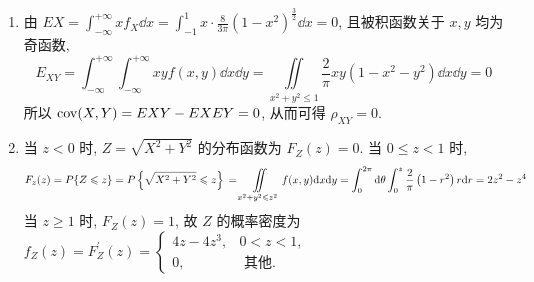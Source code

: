 \begin{solution}
\begin{enumerate}[label=(\arabic{*})]
        \item 由 $\displaystyle EX=\int_{-\infty}^{+\infty} x f_{X} \dd x=\int_{-1}^{1} x \cdot \frac{8}{3 \pi}\left(1-x^{2}\right)^{\frac{3}{2}} \dd x=0$, 且被积函数关于 $ x, y $ 均为奇函数, $$\displaystyle E_{X Y}  =\int_{-\infty}^{+\infty} \int_{-\infty}^{+\infty} x y f(x, y) \dd x \dd y
                  =\iint\limits_{x^{2}+y^{2} \leqslant 1}\frac{2}{\pi} x y\left(1-x^{2}-y^{2}\right) \dd x \dd y=0$$
              所以 $ \mathrm{cov}(X, Y)=E X Y-E X E Y=0 $, 从而可得 $ \rho_{X Y}=0 $.
        \item 当 $ z<0 $ 时, $ Z=\sqrt{X^{2}+Y^{2}} $ 的分布函数为 $ F_{Z}(z)=0 $.
              当 $ 0 \leqslant z<1 $ 时,
              $$
                  F_{z}(z) =P\{Z \leqslant z\}=P\left\{\sqrt{X^{2}+Y^{2}} \leqslant z\right\} \\
                  =\iint\limits_{x^{2}+y^{2} \leqslant z^{2}} f(x, y) \dd x \dd y \\
                  =\int_{0}^{2 \pi} \dd \theta \int_{0}^{z} \frac{2}{\pi}\left(1-r^{2}\right) r \dd r=2 z^{2}-z^{4}
              $$
              当 $ z \geqslant 1 $ 时, $F_{Z}(z)=1 $, 故 $ Z $ 的概率密度为
              $f_{Z}(z)=F_{Z}^{\prime}(z)=\begin{cases}
                      4 z-4 z^{3}, & 0<z<1,          \\
                      0,           & \text { 其他. }
                  \end{cases}$
    \end{enumerate}
\end{solution}